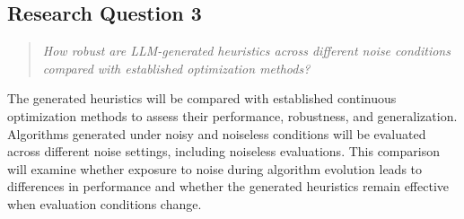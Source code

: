 \subsection*{Research Question 3}

\begin{quote}
\textit{How robust are LLM-generated heuristics across different noise
conditions compared with established optimization methods?}
\end{quote}

The generated heuristics will be compared with established continuous
optimization methods to assess their performance, robustness, and
generalization. Algorithms generated
under noisy and noiseless conditions will be evaluated across different
noise settings, including noiseless evaluations. This comparison will
examine whether exposure to noise during algorithm evolution leads
to differences in performance and whether the generated heuristics
remain effective when evaluation conditions change.